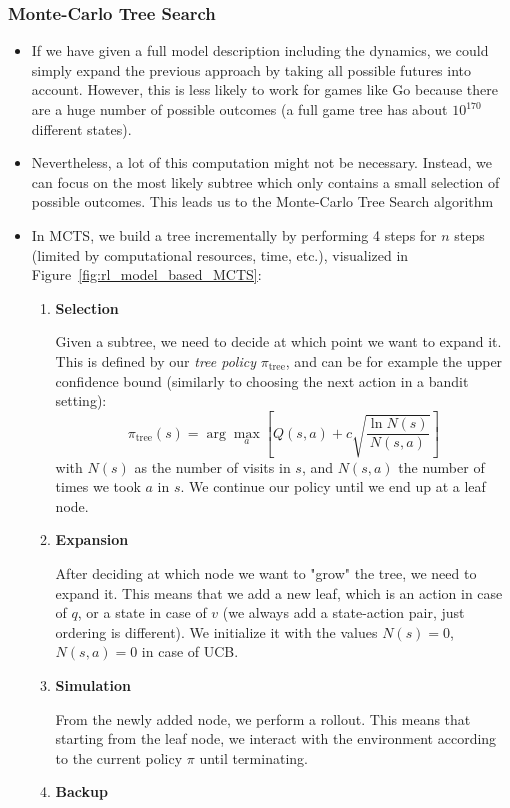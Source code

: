 \subsubsection{Monte-Carlo Tree Search}
\begin{itemize}
	\item If we have given a full model description including the dynamics, we could simply expand the previous approach by taking all possible futures into account. However, this is less likely to work for games like Go because there are a huge number of possible outcomes (a full game tree has about $10^{170}$ different states). 
	\item Nevertheless, a lot of this computation might not be necessary. Instead, we can focus on the most likely subtree which only contains a small selection of possible outcomes. This leads us to the Monte-Carlo Tree Search algorithm
	\item In MCTS, we build a tree incrementally by performing 4 steps for $n$ steps (limited by computational resources, time, etc.), visualized in Figure~\ref{fig:rl_model_based_MCTS}:
	\begin{enumerate}
		\item \textbf{Selection}
		
		Given a subtree, we need to decide at which point we want to expand it. This is defined by our \textit{tree policy} $\pi_{\text{tree}}$, and can be for example the upper confidence bound (similarly to choosing the next action in a bandit setting):
		$$\pi_{\text{tree}}(s)=\arg\max_{a} \left[Q(s,a)+c\sqrt{\frac{\ln N(s)}{N(s,a)}}\right]$$
		with $N(s)$ as the number of visits in $s$, and $N(s,a)$ the number of times we took $a$ in $s$. We continue our policy until we end up at a leaf node.
		\item \textbf{Expansion}
		
		After deciding at which node we want to "grow" the tree, we need to expand it. This means that we add a new leaf, which is an action in case of $q$, or a state in case of $v$ (we always add a state-action pair, just ordering is different). We initialize it with the values $N(s)=0$, $N(s,a)=0$ in case of UCB.
		\item \textbf{Simulation}
		
		From the newly added node, we perform a rollout. This means that starting from the leaf node, we interact with the environment according to the current policy $\pi$ until terminating. 
		\item \textbf{Backup}
		

\end{enumerate}
\end{itemize}
